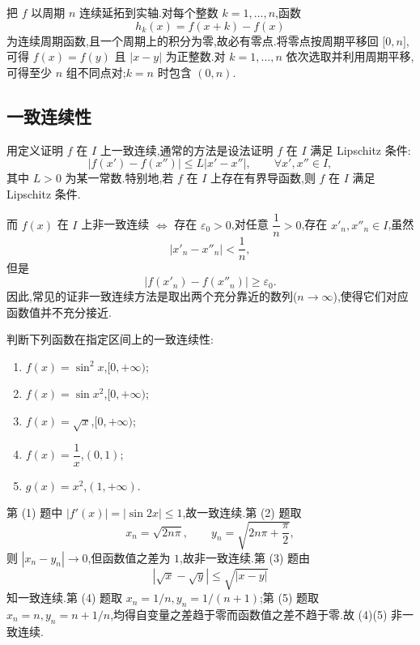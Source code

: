 \begin{solution}
    把 $f$ 以周期 $n$ 连续延拓到实轴.对每个整数 $k=1,\ldots,n$,函数
    \[
        h_k(x)=f(x+k)-f(x)
    \]
    为连续周期函数,且一个周期上的积分为零,故必有零点.将零点按周期平移回 $\lbrack0,n\rbrack$,可得 $f(x)=f(y)$ 且 $|x-y|$ 为正整数.对 $k=1,\ldots,n$ 依次选取并利用周期平移,可得至少 $n$ 组不同点对;$k=n$ 时包含 $(0,n)$.
\end{solution}



\subsection{一致连续性}

用定义证明 $f$ 在 $I$ 上一致连续,通常的方法是设法证明 $f$ 在 $I$ 满足 Lipschitz 条件:
\[
    |f(x')-f(x'')|\leq L|x'-x''|,
    \qquad \forall x',x''\in I,
\]
其中 $L>0$ 为某一常数.特别地,若 $f$ 在 $I$ 上存在有界导函数,则 $f$ 在 $I$ 满足 Lipschitz 条件.

而 $f(x)$ 在 $I$ 上非一致连续 $\Longleftrightarrow$ 存在 $\varepsilon_0>0$,对任意 $\dfrac{1}{n}>0$,存在 $x'_n,x''_n\in I$,虽然
\[
    |x'_n-x''_n|<\dfrac{1}{n},
\]
但是
\[
    |f(x'_n)-f(x''_n)|\geq\varepsilon_0.
\]
因此,常见的证非一致连续方法是取出两个充分靠近的数列($n\to\infty$),使得它们对应函数值并不充分接近.

\begin{example}
    判断下列函数在指定区间上的一致连续性:
    \begin{enumerate}
        \item $f(x)=\sin^2x$,$\lbrack 0,+\infty)$;
        \item $f(x)=\sin x^2$,$\lbrack 0,+\infty)$;
        \item $f(x)=\sqrt{x}$,$\lbrack 0,+\infty)$;
        \item $f(x)=\dfrac{1}{x}$,$(0,1)$;
        \item $g(x)=x^2$,$(1,+\infty)$.
    \end{enumerate}
\end{example}
\exampleblank

\begin{solution}
    第 (1) 题中 $|f'(x)|=|\sin2x|\leq1$,故一致连续.第 (2) 题取
    \[
        x_n=\sqrt{2n\pi},\qquad y_n=\sqrt{2n\pi+\dfrac{\pi}{2}},
    \]
    则 $|x_n-y_n|\to0$,但函数值之差为 $1$,故非一致连续.第 (3) 题由
    \[
        |\sqrt x-\sqrt y|\leq\sqrt{|x-y|}
    \]
    知一致连续.第 (4) 题取 $x_n=1/n,y_n=1/(n+1)$;第 (5) 题取 $x_n=n,y_n=n+1/n$,均得自变量之差趋于零而函数值之差不趋于零.故 (4)(5) 非一致连续.
\end{solution}

